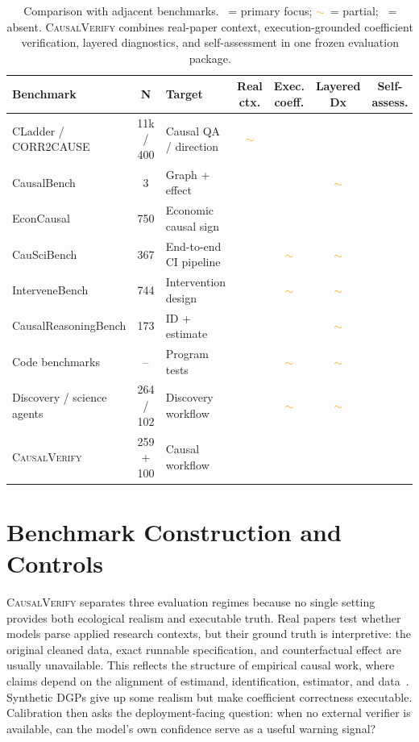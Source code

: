 \documentclass{article}
\newcommand{\Lpass}{\textcolor{passgreen}{\ding{51}}}
\newcommand{\Lfail}{\textcolor{failred}{\ding{55}}}
\newcommand{\Lpart}{\textcolor{orange}{$\sim$}}
\newcommand{\bench}{\textsc{CausalVerify}}
\begin{document}
\begin{table}[H]
\centering
\caption{Comparison with adjacent benchmarks. \Lpass~= primary focus;
\Lpart~= partial; \Lfail~= absent. \bench{} combines real-paper context,
execution-grounded coefficient verification, layered diagnostics, and
self-assessment in one frozen evaluation package.}
\label{tab:benchmark_comparison}
\footnotesize
\renewcommand{\arraystretch}{1.08}
\setlength{\tabcolsep}{2.5pt}
\begin{tabularx}{\textwidth}{lclcccc}
\toprule
\textbf{Benchmark} & \textbf{N} & \textbf{Target} &
\textbf{Real ctx.} & \textbf{Exec. coeff.} &
\textbf{Layered Dx} & \textbf{Self-assess.} \\
\midrule
CLadder / CORR2CAUSE & 11k / 400 & Causal QA / direction
  & \Lpart & \Lfail & \Lfail & \Lfail \\
CausalBench & 3 & Graph + effect
  & \Lfail & \Lfail & \Lpart & \Lfail \\
EconCausal & 750 & Economic causal sign
  & \Lpass & \Lfail & \Lfail & \Lfail \\
CauSciBench & 367 & End-to-end CI pipeline
  & \Lpass & \Lpart & \Lpart & \Lfail \\
InterveneBench & 744 & Intervention design
  & \Lpass & \Lpart & \Lpart & \Lfail \\
CausalReasoningBench & 173 & ID + estimate
  & \Lpass & \Lfail & \Lpart & \Lfail \\
Code benchmarks & -- & Program tests
  & \Lfail & \Lpart & \Lpart & \Lfail \\
Discovery / science agents & 264 / 102 & Discovery workflow
  & \Lpass & \Lpart & \Lpart & \Lfail \\
\rowcolor{lightblue}
\bench{} & 259 + 100 & Causal workflow
  & \Lpass & \Lpass & \Lpass & \Lpass \\
\bottomrule
\end{tabularx}
\end{table}

\section{Benchmark Construction and Controls}

\textsc{CausalVerify} separates three evaluation regimes because no single
setting provides both ecological realism and executable truth. Real papers
test whether models parse applied research contexts, but their ground
truth is interpretive: the original cleaned data, exact runnable
specification, and counterfactual effect are usually unavailable. This
reflects the structure of empirical causal work, where claims depend on
the alignment of estimand, identification, estimator, and
data~\citep{angrist2009mostly,imbens2015causal}.
Synthetic DGPs give up some realism but make coefficient correctness
executable. Calibration then asks the deployment-facing question: when no
external verifier is available, can the model's own confidence serve as a
useful warning signal?
\end{document}
